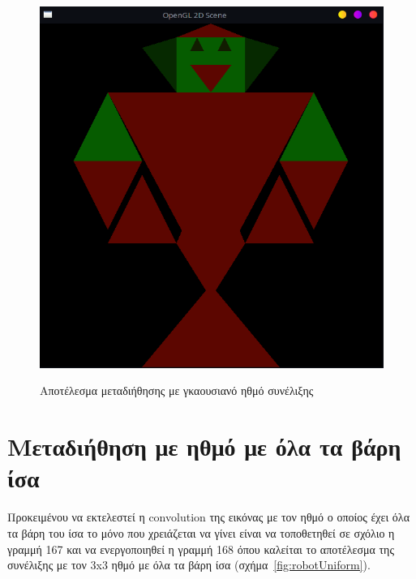 \documentclass[12pt]{article}
\begin{document}
\begin{figure}[!h]
\centering
    {\includegraphics[width=1\textwidth]
    {robot_gaussian_conv.png}}
    \caption{\label{fig:robotGauss} Αποτέλεσμα μεταδιήθησης\cite{CompGraphicsOpenGL} με γκαουσιανό ηθμό συνέλιξης}
\end{figure}
\clearpage

\section{Μεταδιήθηση με ηθμό με όλα τα βάρη ίσα}
Προκειμένου να εκτελεστεί η \gls{convolution} της εικόνας με τον ηθμό ο οποίος έχει όλα τα βάρη του ίσα το μόνο που χρειάζεται να γίνει είναι να τοποθετηθεί σε σχόλιο η γραμμή 167 και να ενεργοποιηθεί η γραμμή 168 όπου καλείται το αποτέλεσμα της συνέλιξης με τον 3x3 ηθμό με όλα τα βάρη ίσα (σχήμα~\ref{fig:robotUniform}).
\end{document}
